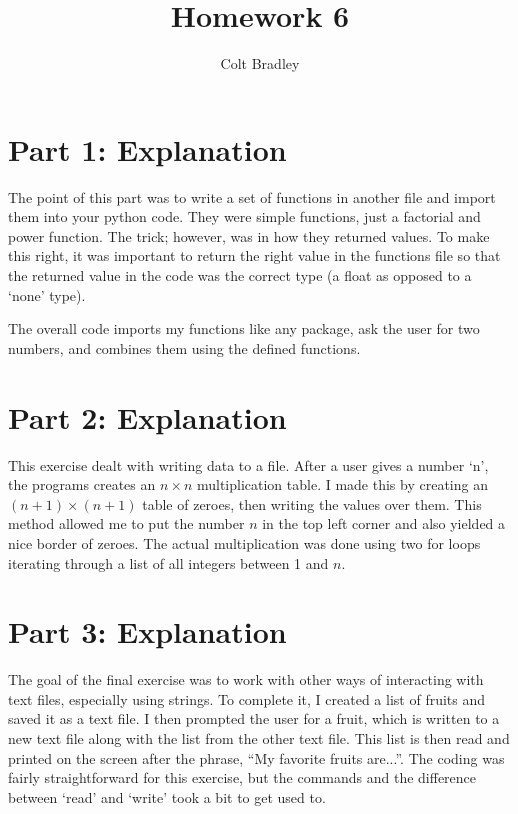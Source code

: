 \documentclass[11pt]{article}
\begin{document}
\title{Homework 6}
\author{Colt Bradley}
\date{}

\maketitle

\section{Part 1: Explanation}
The point of this part was to write a set of functions in another file and import them into your python code. They were simple functions, just a factorial and power function. The trick; however, was in how they returned values. To make this right, it was important to return the right value in the functions file so that the returned value in the code was the correct type (a float as opposed to a `none' type). 

The overall code imports my functions like any package, ask the user for two numbers, and combines them using the defined functions. 

\section{Part 2: Explanation}
This exercise dealt with writing data to a file. After a user gives a number `n', the programs creates an $n \times n$ multiplication table. I made this by creating an $(n+1)\times (n+1)$ table of zeroes, then writing the values over them. This method allowed me to put the number $n$ in the top left corner and also yielded a nice border of zeroes. The actual multiplication was done using two for loops iterating through a list of all integers between 1 and $n$. 

\section{Part 3: Explanation}
The goal of the final exercise was to work with other ways of interacting with text files, especially using strings. To complete it, I created a list of fruits and saved it as a text file. I then prompted the user for a fruit, which is written to a new text file along with the list from the other text file. This list is then read and printed on the screen after the phrase, ``My favorite fruits are...''. The coding was fairly straightforward for this exercise, but the commands and the difference between `read' and `write' took a bit to get used to.  
\end{document}
